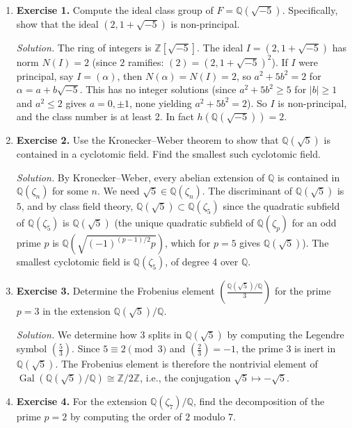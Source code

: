 \begin{enumerate}[leftmargin=*,itemsep=0.9em]

\item \textbf{Exercise 1.} Compute the ideal class group of $F=\mathbb{Q}(\sqrt{-5})$. Specifically, show that the ideal $(2,1+\sqrt{-5})$ is non-principal.

\emph{Solution.} The ring of integers is $\mathbb{Z}[\sqrt{-5}]$. The ideal $I=(2,1+\sqrt{-5})$ has norm $N(I)=2$ (since $2$ ramifies: $(2)=(2,1+\sqrt{-5})^2$). If $I$ were principal, say $I=(\alpha)$, then $N(\alpha)=N(I)=2$, so $a^2+5b^2=2$ for $\alpha=a+b\sqrt{-5}$. This has no integer solutions (since $a^2+5b^2\ge 5$ for $|b|\ge 1$ and $a^2\le 2$ gives $a=0,\pm 1$, none yielding $a^2+5b^2=2$). So $I$ is non-principal, and the class number is at least 2. In fact $h(\mathbb{Q}(\sqrt{-5}))=2$.

\item \textbf{Exercise 2.} Use the Kronecker--Weber theorem to show that $\mathbb{Q}(\sqrt{5})$ is contained in a cyclotomic field. Find the smallest such cyclotomic field.

\emph{Solution.} By Kronecker--Weber, every abelian extension of $\mathbb{Q}$ is contained in $\mathbb{Q}(\zeta_n)$ for some $n$. We need $\sqrt{5}\in\mathbb{Q}(\zeta_n)$. The discriminant of $\mathbb{Q}(\sqrt{5})$ is $5$, and by class field theory, $\mathbb{Q}(\sqrt{5})\subset\mathbb{Q}(\zeta_5)$ since the quadratic subfield of $\mathbb{Q}(\zeta_5)$ is $\mathbb{Q}(\sqrt{5})$ (the unique quadratic subfield of $\mathbb{Q}(\zeta_p)$ for an odd prime $p$ is $\mathbb{Q}(\sqrt{(-1)^{(p-1)/2}p})$, which for $p=5$ gives $\mathbb{Q}(\sqrt{5})$). The smallest cyclotomic field is $\mathbb{Q}(\zeta_5)$, of degree 4 over $\mathbb{Q}$.

\item \textbf{Exercise 3.} Determine the Frobenius element $\left(\frac{\mathbb{Q}(\sqrt{5})/\mathbb{Q}}{3}\right)$ for the prime $p=3$ in the extension $\mathbb{Q}(\sqrt{5})/\mathbb{Q}$.

\emph{Solution.} We determine how $3$ splits in $\mathbb{Q}(\sqrt{5})$ by computing the Legendre symbol $\left(\frac{5}{3}\right)$. Since $5\equiv 2\pmod{3}$ and $\left(\frac{2}{3}\right)=-1$, the prime $3$ is inert in $\mathbb{Q}(\sqrt{5})$. The Frobenius element is therefore the nontrivial element of $\operatorname{Gal}(\mathbb{Q}(\sqrt{5})/\mathbb{Q})\cong\mathbb{Z}/2\mathbb{Z}$, i.e., the conjugation $\sqrt{5}\mapsto -\sqrt{5}$.

\item \textbf{Exercise 4.} For the extension $\mathbb{Q}(\zeta_7)/\mathbb{Q}$, find the decomposition of the prime $p=2$ by computing the order of $2$ modulo $7$.


\end{enumerate}
